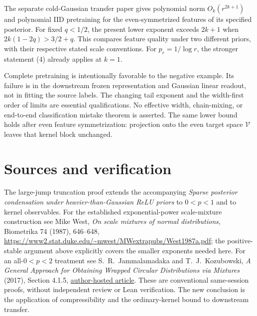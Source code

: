 \documentclass[11pt]{article}
\begin{document}
The separate cold-Gaussian transfer paper gives polynomial norm
$O_k(r^{2k+1})$ and polynomial IID pretraining for the even-symmetrized
features of its specified posterior. For fixed $q<1/2$, the present
lower exponent exceeds $2k+1$ when
$2k(1-2q)>3/2+q$. This compares feature quality under two different
priors, with their respective stated scale conventions.
For $p_r=1/\log r$, the stronger statement (4) already applies at $k=1$.

Complete pretraining is intentionally favorable to the negative
example. Its failure is in the downstream frozen representation and
Gaussian linear readout, not in fitting the source labels.
The changing tail exponent and the width-first order of limits are
essential qualifications. No effective width, chain-mixing, or
end-to-end classification mistake theorem is asserted.
The same lower bound holds after even feature symmetrization: projection
onto the even target space $\mathcal V$ leaves that kernel block unchanged.

\section*{Sources and verification}
The large-jump truncation proof extends the accompanying
\emph{Sparse posterior condensation under heavier-than-Gaussian ReLU
priors} to $0<p<1$ and to kernel observables.
For the established exponential-power scale-mixture construction see
Mike West, \emph{On scale mixtures of normal distributions},
Biometrika 74 (1987), 646--648,
\url{https://www2.stat.duke.edu/~mwest/MWextrapubs/West1987a.pdf};
the positive-stable argument above explicitly covers the smaller
exponents needed here. For an all-$0<p<2$ treatment see
S.~R.~Jammalamadaka and T.~J.~Kozubowski,
\emph{A General Approach for Obtaining Wrapped Circular Distributions
via Mixtures} (2017), Section 4.1.5,
\href{https://jammalam.faculty.pstat.ucsb.edu/html/Some\%20Publications/2017_Wrapped\%20CDs\%20via\%20Mixtures_Sankhya.pdf}{author-hosted article}.
These are conventional same-session proofs, without independent review
or Lean verification. The new conclusion is the application of
compressibility and the ordinary-kernel bound to downstream transfer.
\end{document}
